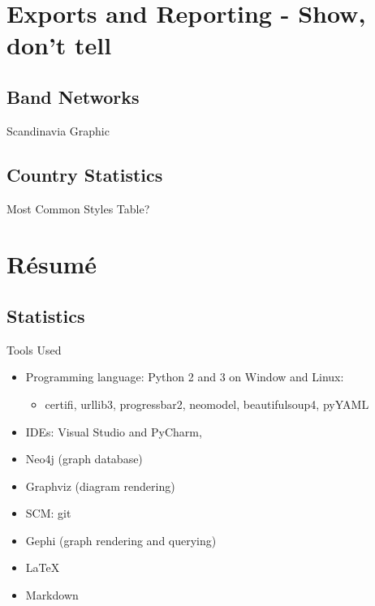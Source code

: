 \documentclass{beamer}
\begin{document}
\section{Exports and Reporting - Show, don't tell}

  \subsection{Band Networks}

    \begin{frame}{Scandinavia}
      Graphic
    \end{frame}

  \subsection{Country Statistics}

    \begin{frame}{Most Common Styles}
      Table?
    \end{frame}

\section{Résumé}

  \subsection{Statistics}

    \begin{frame}{Tools Used}
      \begin{itemize}
        \item<1-> Programming language: Python 2 and 3 on Window and Linux:
          \begin{itemize}
            \item<1-> certifi, urllib3, progressbar2, neomodel, beautifulsoup4, pyYAML

          \end{itemize}
        \item<1-> IDEs: Visual Studio and PyCharm,
        \item<1-> Neo4j (graph database)
        \item<1-> Graphviz (diagram rendering)
        \item<1-> SCM: git
        \item<1-> Gephi (graph rendering and querying)
        \item<1-> \LaTeX{}
        \item<1-> Markdown
      \end{itemize}
    \end{frame}
    
\end{document}
